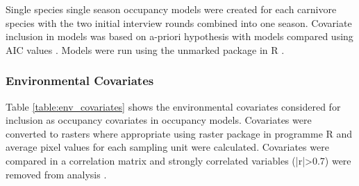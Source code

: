 Single species single season occupancy models were created for each carnivore species with the two initial interview rounds combined into one season. Covariate inclusion in models was based on a-priori hypothesis with models compared using AIC values \cite{Burnham2003}. Models were run using the unmarked package \cite{Fiske2011} in R \cite{RCoreTeam2015}.\\

\subsubsection{Environmental Covariates}
Table \ref{table:env_covariates} shows the environmental covariates considered for inclusion as occupancy covariates in occupancy models. Covariates were converted to rasters where appropriate using raster package \cite{Hijmans2014} in programme R \cite{RCoreTeam2015} and average pixel values for each sampling unit were calculated. Covariates were compared in a correlation matrix and strongly correlated variables (|r|>0.7) were removed from analysis \cite{Dormann_2012}.

